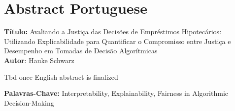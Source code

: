 \chapter*{Abstract Portuguese}\label{abstractp}

\noindent
\textbf{Título:} Avaliando a Justiça das Decisões de Empréstimos Hipotecários: \\
Utilizando Explicabilidade para Quantificar o Compromisso entre Justiça e Desempenho em Tomadas de Decisão Algorítmicas\\
\textbf{Autor}: Hauke Schwarz
\vspace{1em}

Tbd once English abstract is finalized

\vspace{3em}

\textbf{Palavras-Chave:} Interpretability, Explainability, Fairness in Algorithmic Decision-Making \\